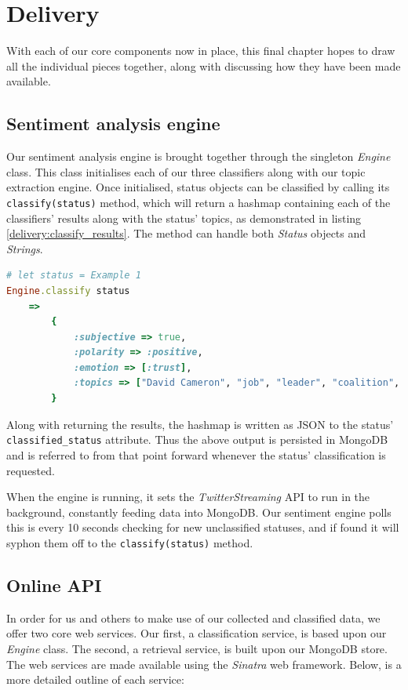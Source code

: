 \chapter{Delivery}
\label{delivery}

With each of our core components now in place, this final chapter hopes to draw all the individual pieces together, along with discussing how they have been made available.

\section{Sentiment analysis engine}

Our sentiment analysis engine is brought together through the singleton \emph{Engine} class. This class initialises each of our three classifiers along with our topic extraction engine. Once initialised, status objects can be classified by calling its \texttt{classify(status)} method, which will return a hashmap containing each of the classifiers' results along with the status' topics, as demonstrated in listing \ref{delivery:classify_results}. The method can handle both \emph{Status} objects and \emph{Strings}.

\begin{lstlisting}[language=Ruby, caption={Returned part of speech tags for \emph{Example 1}}, label=delivery:classify_results]
# let status = Example 1
Engine.classify status
	=>
		{
			:subjective => true,
			:polarity => :positive,
			:emotion => [:trust],
			:topics => ["David Cameron", "job", "leader", "coalition", "labour"]
		}
\end{lstlisting}

Along with returning the results, the hashmap is written as JSON to the status' \texttt{classified\_status} attribute. Thus the above output is persisted in MongoDB and is referred to from that point forward whenever the status' classification is requested.

When the engine is running, it sets the \emph{TwitterStreaming} API to run in the background, constantly feeding data into MongoDB. Our sentiment engine polls this is every 10 seconds checking for new unclassified statuses, and if found it will syphon them off to the \texttt{classify(status)} method.

\section{Online API}

In order for us and others to make use of our collected and classified data, we offer two core web services. Our first, a classification service, is based upon our \emph{Engine} class. The second, a retrieval service, is built upon our MongoDB store. The web services are made available using the \emph{Sinatra} web framework. Below, is a more detailed outline of each service:

